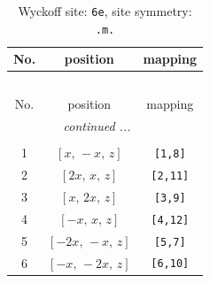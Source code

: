 \documentclass[fleqn,8pt]{jsarticle}
\begin{document}
\renewcommand{\arraystretch}{1.2}
\begin{longtable}{ccc}
\caption{Wyckoff site: {\tt 6e}, site symmetry: {\tt .m.}}
 \\
 \hline \hline
No. & position & mapping \\ \hline \endfirsthead

\multicolumn{2}{l}{\tablename\ \thetable{}} \\
 \hline \hline
No. & position & mapping \\ \hline \endhead

 \hline \hline
\multicolumn{2}{r}{\footnotesize\it continued ...} \\ \endfoot

 \hline \hline
\multicolumn{2}{r}{} \\ \endlastfoot

1 & $\left[ x,\, - x,\, z \right]$ & {\tt [1,8]} \\ \hline
2 & $\left[ 2 x,\, x,\, z \right]$ & {\tt [2,11]} \\ \hline
3 & $\left[ x,\, 2 x,\, z \right]$ & {\tt [3,9]} \\ \hline
4 & $\left[ - x,\, x,\, z \right]$ & {\tt [4,12]} \\ \hline
5 & $\left[ - 2 x,\, - x,\, z \right]$ & {\tt [5,7]} \\ \hline
6 & $\left[ - x,\, - 2 x,\, z \right]$ & {\tt [6,10]} \\
\end{longtable}
\renewcommand{\arraystretch}{1.2}
\end{document}
